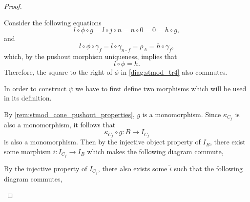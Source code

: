 \begin{proof}
\begin{enumerate}[label={(\bfseries TR\arabic*)}]
{\begin{center}
            \end{center}
            Consider the following equations
            \[
                l \circ \phi \circ g = l \circ j \circ n = n \circ 0 = 0 = h \circ g,
            \]
            and
            \[
                l \circ \phi \circ \gamma_f = l \circ \gamma_{n \circ f} = \rho_A = h \circ \gamma_f,
            \]
            which, by the pushout morphism uniqueness, implies that
            \[
                l \circ \phi = h.
            \]
            Therefore, the square to the right of \( \phi \) in \autoref{diag:stmod_tr4} also commutes.

            In order to construct \( \psi \) we have to first define two morphisms which will be used in its definition.

            By \autoref{rem:stmod_cone_pushout_properties}, \( g \) is a monomorphism. Since \( \kappa_{C_f} \) is also a monomorphism, it follows that
            \[
                \kappa_{C_f} \circ g: B \to I_{C_f}
            \]
            is also a monomorphism. Then by the injective object property of \( I_B \), there exist some morphism \( i: I_{C_f} \to I_B \) which makes the following diagram commute,
            \begin{center}
            \end{center}
            By the injective property of \( I_{C_f} \), there also exists some \( \tilde{i} \) such that the following diagram commutes,
            \begin{center}
\end{center}}
\end{enumerate}
\end{proof}
